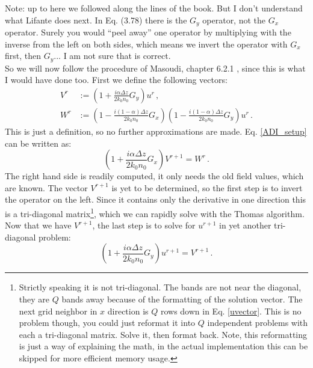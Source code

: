 \documentclass[]{article}
\begin{document}
	Note: up to here we followed along the lines of the book\cite{Lifante_2015}. But I don't understand what Lifante does next. In Eq. (3.78) there is the $G_y$ operator, not the $G_x$ operator. Surely you would ``peel away'' one operator by multiplying with the inverse from the left on both sides, which means we invert the operator with $G_x$ first, then $G_y$... I am not sure that is correct.\\
	
	So we will now follow the procedure of Masoudi, chapter 6.2.1 \cite{masoudi1995parallel}, since this is what I would have done too. First we define the following vectors:
	\begin{subequations}
		\begin{align}
			V^r &:= \left(1+\frac{i\alpha \Delta z}{2k_0 n_0}G_y \right) u^r\, ,\\
			W^r &:= \left(1-\frac{i(1-\alpha) \Delta z}{2k_0 n_0}G_x \right)\left(1-\frac{i(1-\alpha) \Delta z}{2k_0 n_0}G_y \right) u^r \, .
		\end{align}
	\end{subequations}
	This is just a definition, so no further approximations are made. Eq. \eqref{ADI_setup} can be written as:
	\begin{equation}
		\left(1+\frac{i\alpha \Delta z}{2k_0 n_0}G_x \right) V^{r+1} = W^r\, .
	\end{equation}
	The right hand side is readily computed, it only needs the old field values, which are known. The vector $V^{r+1}$ is yet to be determined, so the first step is to invert the operator on the left. Since it contains only the derivative in one direction this is a tri-diagonal matrix\footnote{Strictly speaking it is not tri-diagonal. The bands are not near the diagonal, they are $Q$ bands away because of the formatting of the solution vector. The next grid neighbor in $x$ direction is $Q$ rows down in Eq. \eqref{uvector}. This is no problem though, you could just reformat it into $Q$ independent problems with each a tri-diagonal matrix. Solve it, then format back. Note, this reformatting is just a way of explaining the math, in the actual implementation this can be skipped for more efficient memory usage.}, which we can rapidly solve with the Thomas algorithm. Now that we have $V^{r+1}$, the last step is to solve for $u^{r+1}$ in yet another tri-diagonal problem:
	\begin{equation}
		\left(1+\frac{i\alpha \Delta z}{2k_0 n_0}G_y \right) u^{r+1} = V^{r+1}\, .
	\end{equation}
	
\end{document}
